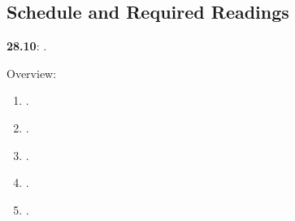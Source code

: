 \documentclass[letterpaper]{article}
\renewenvironment{itemize}{
  \begin{list}{}{
    \setlength{\leftmargin}{1.5em}
  }
}{
  \end{list}
}
\begin{document}
\subsection*{Schedule and Required Readings}


\begin{enumerate}

\item {\bf 28.10}: {\color{ForestGreen}{\bf Causal Inference in Social Science}}.

      \begin{itemize} 

        \item[$\diamond$] Overview:

        \begin{enumerate}

          \item[$\bullet$] \href{https://doi.org/10.1017/9781108991353.003}{}.


          \item[$\bullet$] \href{https://doi.org/10.1017/CBO9781107587991.003}{}.


          \item[$\bullet$] \href{https://www.jstor.org/stable/270939}{}.

          \item[$\bullet$] \href{https://www.jstor.org/stable/2676760}{}.

          \item[$\bullet$] \href{https://www.jstor.org/stable/2676760}{}.



        \end{enumerate}


\end{itemize}
\end{enumerate}
\end{document}
